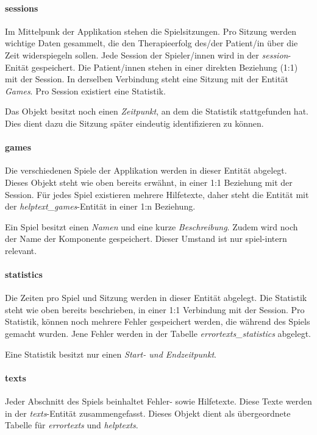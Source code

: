 \paragraph{sessions}
Im Mittelpunk der Applikation stehen die Spielsitzungen. Pro Sitzung werden wichtige Daten gesammelt, die den Therapieerfolg des/der Patient/in über die Zeit widerspiegeln sollen. Jede Session der Spieler/innen wird in der \textit{session}-Enität gespeichert. Die Patient/innen stehen in einer direkten Beziehung (1:1) mit der Session. In derselben Verbindung steht eine Sitzung mit der Entität \textit{Games}. Pro Session existiert eine Statistik.

Das Objekt besitzt noch einen \textit{Zeitpunkt}, an dem die Statistik stattgefunden hat. Dies dient dazu die Sitzung später eindeutig identifizieren zu können.
    
\paragraph{games}
Die verschiedenen Spiele der Applikation werden in dieser Entität abgelegt. Dieses Objekt steht wie oben bereits erwähnt, in einer 1:1 Beziehung mit der Session. Für jedes Spiel existieren mehrere Hilfetexte, daher steht die Entität mit der \textit{helptext\_games}-Entität in einer 1:n Beziehung.

Ein Spiel besitzt einen \textit{Namen} und eine kurze \textit{Beschreibung}. Zudem wird noch der Name der Komponente gespeichert. Dieser Umstand ist nur spiel-intern relevant.
    
\paragraph{statistics}
Die Zeiten pro Spiel und Sitzung werden in dieser Entität abgelegt. Die Statistik steht wie oben bereits beschrieben, in einer 1:1 Verbindung mit der Session. Pro Statistik, können noch mehrere Fehler gespeichert werden, die während des Spiels gemacht wurden. Jene Fehler werden in der Tabelle \textit{errortexts\_statistics} abgelegt.

Eine Statistik besitzt nur einen \textit{Start- und Endzeitpunkt}.
    
\paragraph{texts}
Jeder Abschnitt des Spiels beinhaltet Fehler- sowie Hilfetexte. Diese Texte werden in der \textit{texts}-Entität zusammengefasst. Dieses Objekt dient als übergeordnete Tabelle für \textit{errortexts} und \textit{helptexts}.

